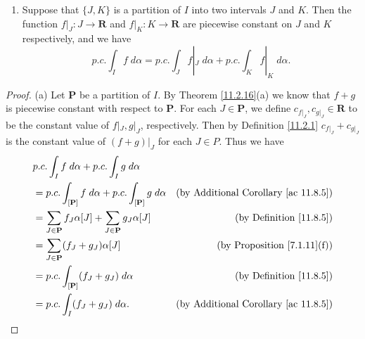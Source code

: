\begin{additional corollary}
\begin{enumerate}
\[\begin{cases}
                  0    & \text{if } x \notin I
              \end{cases}
          \]
          Then \(F\) is piecewise constant on \(J\), and \(p.c. \int_J F \; d \alpha = p.c. \int_I f \; d \alpha\).
    \item Suppose that \(\{J, K\}\) is a partition of \(I\) into two intervals \(J\) and \(K\).
          Then the function \(f|_J : J \to \mathbf{R}\) and \(f|_K : K \to \mathbf{R}\) are piecewise constant on \(J\) and \(K\) respectively, and we have
          \[
              p.c. \int_I f \; d \alpha = p.c. \int_J f|_J \; d \alpha + p.c. \int_K f|_K \; d \alpha.
          \]
\end{enumerate}
\end{additional corollary}

\begin{proof}{(a)}
    Let \(\mathbf{P}\) be a partition of \(I\).
    By Theorem \ref{11.2.16}(a) we know that \(f + g\) is piecewise constant with respect to \(\mathbf{P}\).
    For each \(J \in \mathbf{P}\), we define \(c_{f|_J}, c_{g|_J} \in \mathbf{R}\) to be the constant value of \(f|_J, g|_J\), respectively.
    Then by Definition \ref{11.2.1} \(c_{f|_J} + c_{g|_J}\) is the constant value of \((f + g)|_J\) for each \(J \in P\).
    Thus we have
    \begin{align*}
         & p.c. \int_I f \; d \alpha + p.c. \int_I g \; d \alpha                                                                                \\
         & = p.c. \int_{[\mathbf{P}]} f \; d \alpha + p.c. \int_{[\mathbf{P}]} g \; d \alpha & \text{(by Additional Corollary \ref{ac 11.8.5})} \\
         & = \sum_{J \in \mathbf{P}} f_J \alpha[J] + \sum_{J \in \mathbf{P}} g_J \alpha[J]   & \text{(by Definition \ref{11.8.5})}              \\
         & = \sum_{J \in \mathbf{P}} (f_J + g_J) \alpha[J]                                   & \text{(by Proposition \ref{7.1.11}(f))}          \\
         & = p.c. \int_{[\mathbf{P}]} (f_J + g_J) \; d \alpha                                & \text{(by Definition \ref{11.8.5})}              \\
         & = p.c. \int_I (f_J + g_J) \; d \alpha.                                            & \text{(by Additional Corollary \ref{ac 11.8.5})}
    \end{align*}
\end{proof}

